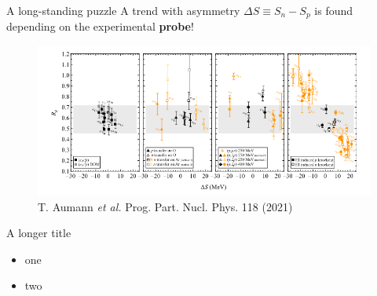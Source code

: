 \documentclass[aspectratio=43]{beamer}
\begin{document}
\begin{frame}{A long-standing puzzle}
    A trend with asymmetry $\Delta S \equiv S_{n} - S_{p}$ is found depending on the experimental \textbf{probe}!
    \begin{figure}
        \includegraphics[width=0.9\linewidth]{figures/Rs_aumann_review.png}
        \caption{T. Aumann \textit{et al.} Prog. Part. Nucl. Phys. 118 (2021)}
    \end{figure}

\end{frame}

\begin{frame}{A longer title}
    \begin{itemize}
        \item one
        \item two
    \end{itemize}
\end{frame}
\end{document}
